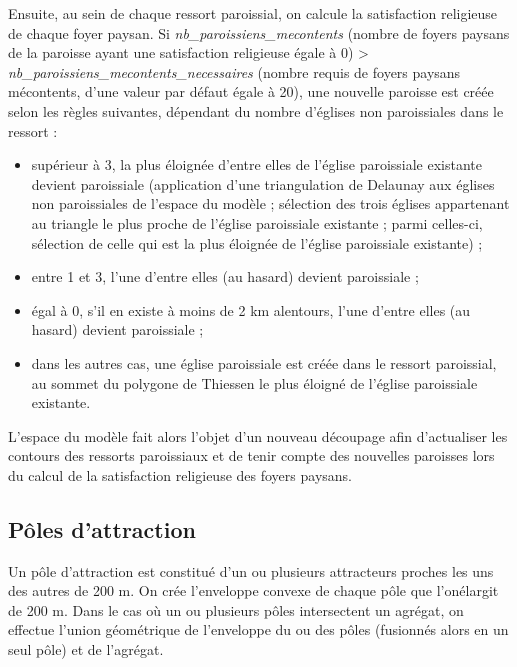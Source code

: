 \documentclass[a4paper,11pt]{article}
\begin{document}
{Ensuite, au sein de chaque ressort paroissial, on calcule la satisfaction religieuse de chaque foyer paysan. Si \textit{nb\_paroissiens\_mecontents} (nombre de foyers paysans de la paroisse ayant une satisfaction religieuse égale à 0) > \textit{nb\_paroissiens\_mecontents\_necessaires} (nombre requis de foyers paysans mécontents, d'une valeur par défaut égale à 20), une nouvelle paroisse est créée selon les règles suivantes, dépendant du nombre d'églises non paroissiales dans le ressort :
	\begin{itemize}
\item supérieur à 3, la plus éloignée d'entre elles de l'église paroissiale existante devient paroissiale (application d'une triangulation de Delaunay aux églises non paroissiales de l'espace du modèle ; sélection des trois églises appartenant au triangle le plus proche de l'église paroissiale existante ; parmi celles-ci, sélection de celle qui est la plus éloignée de l'église paroissiale existante) ;
\item entre 1 et 3, l'une d'entre elles (au hasard) devient paroissiale ;
\item égal à 0, s'il en existe à moins de 2 km alentours, l'une d'entre elles (au hasard) devient paroissiale ;
\item dans les autres cas, une église paroissiale est créée dans le ressort paroissial, au sommet du polygone de Thiessen le plus éloigné de l'église paroissiale existante.
	\end{itemize}
	
L'espace du modèle fait alors l'objet d'un nouveau découpage afin d'actualiser les contours des ressorts paroissiaux et de tenir compte des nouvelles paroisses lors du calcul de la satisfaction religieuse des foyers paysans.


\subsection{Pôles d'attraction}

Un pôle d'attraction est constitué d'un ou plusieurs attracteurs proches les uns des autres de 200 m. On crée l'enveloppe convexe de chaque pôle que l'onélargit de 200 m. Dans le cas où un ou plusieurs pôles intersectent un agrégat, on effectue l'union géométrique de l'enveloppe du ou des pôles (fusionnés alors en un seul pôle) et de l'agrégat.

}
\end{document}

